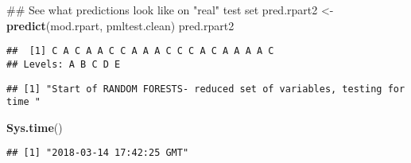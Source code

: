 \documentclass[]{article}
\newenvironment{Shaded}{\begin{snugshade}}{\end{snugshade}}
\newcommand{\KeywordTok}[1]{\textcolor[rgb]{0.13,0.29,0.53}{\textbf{{#1}}}}
\newcommand{\DataTypeTok}[1]{\textcolor[rgb]{0.13,0.29,0.53}{{#1}}}
\newcommand{\DecValTok}[1]{\textcolor[rgb]{0.00,0.00,0.81}{{#1}}}
\newcommand{\FloatTok}[1]{\textcolor[rgb]{0.00,0.00,0.81}{{#1}}}
\newcommand{\StringTok}[1]{\textcolor[rgb]{0.31,0.60,0.02}{{#1}}}
\newcommand{\OtherTok}[1]{\textcolor[rgb]{0.56,0.35,0.01}{{#1}}}
\newcommand{\NormalTok}[1]{{#1}}
\begin{document}
\begin{Shaded}
\begin{Highlighting}[]
\NormalTok{## See what predictions look like on "real" test set}
\NormalTok{pred.rpart2 <-}\StringTok{ }\KeywordTok{predict}\NormalTok{(mod.rpart, pmltest.clean)}
\NormalTok{pred.rpart2}
\end{Highlighting}
\end{Shaded}

\begin{verbatim}
##  [1] C A C A A C C A A A C C C A C A A A A C
## Levels: A B C D E
\end{verbatim}

\begin{Shaded}
\end{Shaded}

\begin{verbatim}
## [1] "Start of RANDOM FORESTS- reduced set of variables, testing for time "
\end{verbatim}

\begin{Shaded}
\begin{Highlighting}[]
\KeywordTok{Sys.time}\NormalTok{()}
\end{Highlighting}
\end{Shaded}

\begin{verbatim}
## [1] "2018-03-14 17:42:25 GMT"
\end{verbatim}
\end{document}
